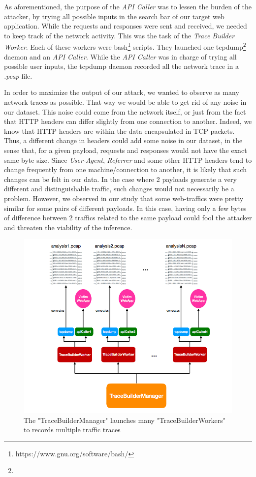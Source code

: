\documentclass[runningheads]{llncs}
\begin{document}
As aforementioned, the purpose of the \emph{API Caller} was to lessen the burden of the attacker, by trying all possible inputs in the search bar of our target web application. While the requests and responses were sent and received, we needed to keep track of the network activity. This was the task of the \emph{Trace Builder Worker}. Each of these workers were bash\footnote{https://www.gnu.org/software/bash/} scripts. They launched one tcpdump\footnote{} daemon and an \emph{API Caller}. While the \emph{API Caller} was in charge of trying all possible user inputs, the tcpdump daemon recorded all the network trace in a \emph{.pcap} file.

\medskip

In order to maximize the output of our attack, we wanted to observe as many network traces as possible. That way we would be able to get rid of any noise in our dataset. This noise could come from the network itself, or just from the fact that HTTP headers can differ slightly from one connection to another. Indeed, we know that HTTP headers are within the data encapsulated in TCP packets. Thus, a different change in headers could add some noise in our dataset, in the sense that, for a given payload, requests and responses would not have the exact same byte size. Since \emph{User-Agent}, \emph{Referrer} and some other HTTP headers tend to change frequently from one machine/connection to another, it is likely that such changes can be felt in our data. In the case where 2 payloads generate a very different and distinguishable traffic, such changes would not necessarily be a problem. However, we observed in our study that some web-traffics were pretty similar for some pairs of different payloads. In this case, having only a few bytes of difference between 2 traffics related to the same payload could fool the attacker and threaten the viability of the inference.

\begin{figure}[h]
\centering
\includegraphics[width=\textwidth]{images/traceBuilderManager.png}
\caption{The "TraceBuilderManager" launches many "TraceBuilderWorkers" to records multiple traffic traces}
\label{fig:traceBuilderManager}
\end{figure}
\end{document}
